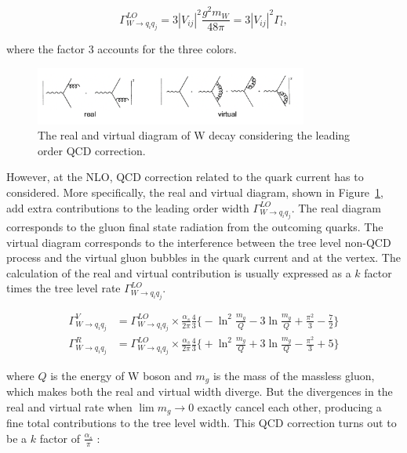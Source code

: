 \begin{equation}
\Gamma_{W \to q_i q_j}^{LO} = 3 |V_{ij}|^2 \frac{g^2 m_W}{48 \pi}  = 3 |V_{ij}|^2 \Gamma_l ,
\end{equation}

\noindent  where the factor 3 accounts for the three colors.

\begin{figure}
    \centering
    \includegraphics[width=0.8\textwidth]{chapters/RelatedWorks/sectionVcs/figures/realVirtual.png}
    \caption{ The real and virtual diagram of W decay considering the leading order QCD correction. }
    \label{fig:relatedWorks:vcs:realVirtual}
\end{figure}

\noindent However, at the NLO, QCD correction related to the quark current has to considered. More specifically, the real and virtual diagram, shown in Figure~\ref{fig:relatedWorks:vcs:realVirtual}, add extra contributions to the leading order width $\Gamma_{W \to q_i q_j}^{LO} $. The real diagram corresponds to the gluon final state radiation from the outcoming quarks. The virtual diagram corresponds to the interference between the tree level non-QCD process and the virtual gluon bubbles in the quark current and at the vertex. The calculation of the real and virtual contribution is usually expressed as a $k$ factor times the tree level rate  $\Gamma_{W \to q_i q_j}^{LO} $.
 
 \begin{align}
 	\Gamma^V_{W \to q_i q_j}  &= \Gamma_{W \to q_i q_j}^{LO} \times \frac{\alpha_s}{2\pi}\frac{4}{3} \bigg \{  -\ln^2\frac{m_g}{Q} -3 \ln\frac{m_g}{Q} + \frac{\pi^2}{3}-\frac{7}{2} \bigg\} \\
    \Gamma^R_{W \to q_i q_j}  &= \Gamma_{W \to q_i q_j}^{LO} \times \frac{\alpha_s}{2\pi}\frac{4}{3} \bigg \{  +\ln^2\frac{m_g}{Q} + 3 \ln\frac{m_g}{Q} - \frac{\pi^2}{3}+ 5 \bigg\}
 \end{align}
 
\noindent  where $Q$ is the energy of W boson and $m_g$ is the mass of the massless gluon, which makes both the real and virtual width diverge. But the divergences in the real and virtual rate when $\lim m_g \to 0$ exactly cancel each other, producing a fine total contributions to the tree level width. This QCD correction turns out to be a $k$ factor of $\frac{\alpha_s}{\pi}$ :

